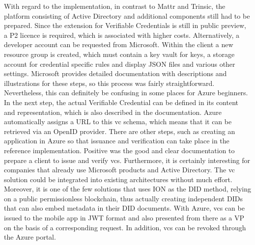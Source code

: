         With regard to the implementation, in contrast to Mattr and Trinsic, the platform consisting of Active Directory and additional components still had to be prepared. Since the extension for Verifiable Credentials is still in public preview, a P2 licence is required, which is associated with higher costs. Alternatively, a developer account can be requested from Microsoft. Within the client a new resource group is created, which must contain a key vault for keys, a storage account for credential specific rules and display JSON files and various other settings. Microsoft provides detailed documentation with descriptions and illustrations for these steps, so this process was fairly straightforward. Nevertheless, this can definitely be confusing in some places for Azure beginners. In the next step, the actual Verifiable Credential can be defined in its content and representation, which is also described in the documentation. Azure automatically assigns a URL to this \ac{vc} schema, which means that it can be retrieved via an OpenID provider. There are other steps, such as creating an application in Azure so that issuance and verification can take place in the reference implementation. Positive was the good and clear documentation to prepare a client to issue and verify \acp{vc}. Furthermore, it is certainly interesting for companies that already use Microsoft products and Active Directory. The \ac{vc} solution could be integrated into existing architectures without much effort. Moreover, it is one of the few solutions that uses ION as the \ac{DID} method, relying on a public permissionless blockchain, thus actually creating independent \acp{DID} that can also embed metadata in their \ac{DID} documents. With Azure, \acp{vc} can be issued to the mobile app in JWT format and also presented from there as a \ac{VP} on the basis of a corresponding request. In addition, \acp{vc} can be revoked through the Azure portal.  
    
